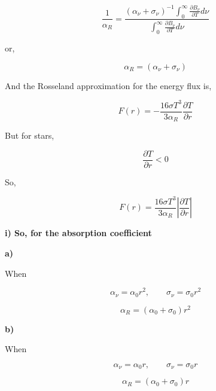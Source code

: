 \documentclass{article}
\begin{document}
\begin{equation}
\frac{1}{\alpha_R}
=
\frac{(\alpha_\nu+\sigma_\nu)^{-1}
\int_0^\infty \frac{\partial B_\nu}{\partial T} d\nu}
{\int_0^\infty \frac{\partial B_\nu}{\partial T} d\nu}
\end{equation}

or,

\begin{equation}
\boxed{\alpha_R=(\alpha_\nu+\sigma_\nu)}
\end{equation}

And the Rosseland approximation for the energy flux is,

\begin{equation}
F(r)=
-\frac{16\sigma T^3}{3\alpha_R}\frac{\partial T}{\partial r}
\end{equation}

But for stars,

\begin{equation}
\frac{\partial T}{\partial r}<0
\end{equation}

So,

\begin{equation}
\boxed{
F(r)=
\frac{16\sigma T^3}{3\alpha_R}
\left|\frac{\partial T}{\partial r}\right|
}
\end{equation}

\bigskip

\textbf{i) So, for the absorption coefficient}

\medskip

\textbf{a)}

When

\begin{equation}
\alpha_\nu=\alpha_0 r^2 , \qquad
\sigma_\nu=\sigma_0 r^2
\end{equation}

\begin{equation}
\boxed{\alpha_R=(\alpha_0+\sigma_0)r^2}
\end{equation}

\medskip

\textbf{b)}

When

\begin{equation}
\alpha_\nu=\alpha_0 r , \qquad
\sigma_\nu=\sigma_0 r
\end{equation}

\begin{equation}
\boxed{\alpha_R=(\alpha_0+\sigma_0)r}
\end{equation}
\end{document}
